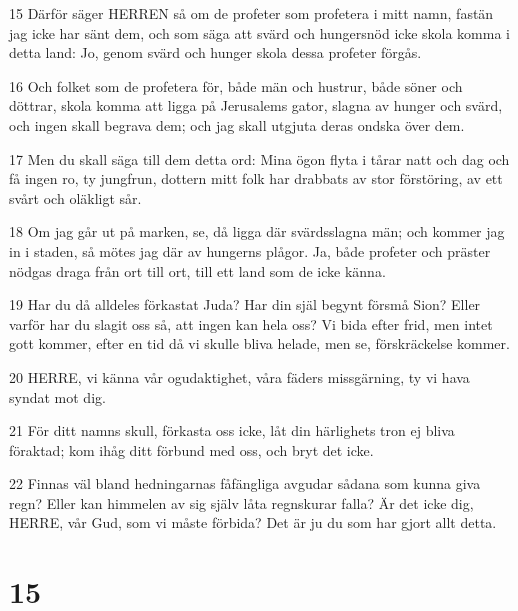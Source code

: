 \par 15 Därför säger HERREN så om de profeter som profetera i mitt namn, fastän jag icke har sänt dem, och som säga att svärd och hungersnöd icke skola komma i detta land: Jo, genom svärd och hunger skola dessa profeter förgås.
\par 16 Och folket som de profetera för, både män och hustrur, både söner och döttrar, skola komma att ligga på Jerusalems gator, slagna av hunger och svärd, och ingen skall begrava dem; och jag skall utgjuta deras ondska över dem.
\par 17 Men du skall säga till dem detta ord: Mina ögon flyta i tårar natt och dag och få ingen ro, ty jungfrun, dottern mitt folk har drabbats av stor förstöring, av ett svårt och oläkligt sår.
\par 18 Om jag går ut på marken, se, då ligga där svärdsslagna män; och kommer jag in i staden, så mötes jag där av hungerns plågor. Ja, både profeter och präster nödgas draga från ort till ort, till ett land som de icke känna.
\par 19 Har du då alldeles förkastat Juda? Har din själ begynt försmå Sion? Eller varför har du slagit oss så, att ingen kan hela oss? Vi bida efter frid, men intet gott kommer, efter en tid då vi skulle bliva helade, men se, förskräckelse kommer.
\par 20 HERRE, vi känna vår ogudaktighet, våra fäders missgärning, ty vi hava syndat mot dig.
\par 21 För ditt namns skull, förkasta oss icke, låt din härlighets tron ej bliva föraktad; kom ihåg ditt förbund med oss, och bryt det icke.
\par 22 Finnas väl bland hedningarnas fåfängliga avgudar sådana som kunna giva regn? Eller kan himmelen av sig själv låta regnskurar falla? Är det icke dig, HERRE, vår Gud, som vi måste förbida? Det är ju du som har gjort allt detta.

\chapter{15}

